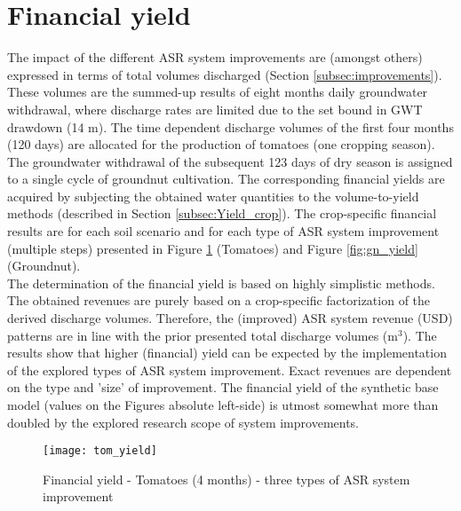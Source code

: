 \section{Financial yield}
\label{section:fin_yield}
The impact of the different ASR system improvements are (amongst others) expressed in terms of total volumes discharged (Section \ref{subsec:improvements}). These volumes are the summed-up results of eight months daily groundwater withdrawal, where discharge rates are limited due to the set bound in GWT drawdown (14 m). The time dependent discharge volumes of the first four months (120 days) are allocated for the production of tomatoes (one cropping season). The groundwater withdrawal of the subsequent 123 days of dry season is assigned to a single cycle of groundnut cultivation. The corresponding financial yields are acquired by subjecting the obtained water quantities to the volume-to-yield methods (described in Section \ref{subsec:Yield_crop}). The crop-specific financial results are for each soil scenario and for each type of ASR system improvement (multiple steps) presented in Figure \ref{fig:tom_yield} (Tomatoes) and Figure \ref{fig:gn_yield} (Groundnut). \\

The determination of the financial yield is based on highly simplistic methods. The obtained revenues are purely based on a crop-specific factorization of the derived discharge volumes. Therefore, the (improved) ASR system revenue (USD) patterns are in line with the prior presented total discharge volumes (m$^3$). The results show that higher (financial) yield can be expected by the implementation of the explored types of ASR system improvement. Exact revenues are dependent on the type and 'size' of improvement. The financial yield of the synthetic base model (values on the Figures absolute left-side) is utmost somewhat more than doubled by the explored research scope of system improvements. \\


 \begin{figure}[h!]
 \centering
 \texttt{[image: tom\_yield]}
 \captionsetup{justification=centering} 
 \caption{Financial yield - Tomatoes (4 months) - three types of ASR system improvement}
 \label{fig:tom_yield}
\end{figure}

